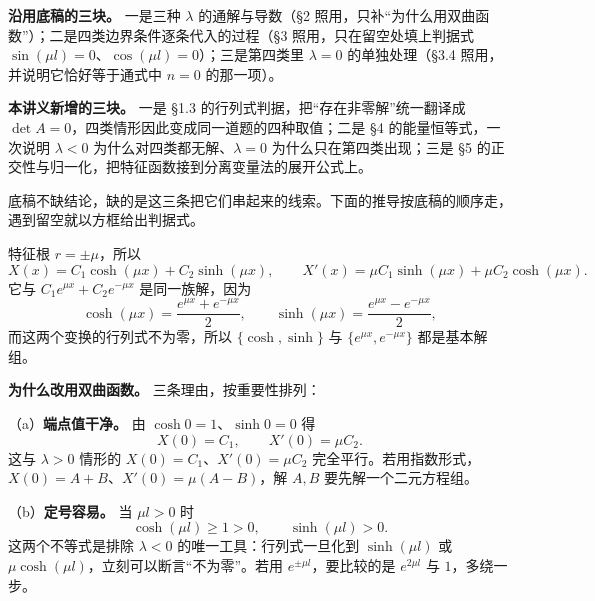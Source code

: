 \documentclass[11pt]{ctexart}
\let\orighdr\hdr
\renewcommand{\hdr}[2]{\needspace{12\baselineskip}\orighdr{#1}{#2}}
\let\origsubhdr\subhdr
\renewcommand{\subhdr}[1]{\needspace{3\baselineskip}\origsubhdr{#1}}
\begin{document}


\textbf{沿用底稿的三块。} 一是三种 $\lambda$ 的通解与导数（§2 照用，只补“为什么用双曲函数”）；二是四类边界条件逐条代入的过程（§3 照用，只在留空处填上判据式 $\sin(\mu l)=0$、$\cos(\mu l)=0$）；三是第四类里 $\lambda=0$ 的单独处理（§3.4 照用，并说明它恰好等于通式中 $n=0$ 的那一项）。

\textbf{本讲义新增的三块。} 一是 §1.3 的行列式判据，把“存在非零解”统一翻译成 $\det A=0$，四类情形因此变成同一道题的四种取值；二是 §4 的能量恒等式，一次说明 $\lambda<0$ 为什么对四类都无解、$\lambda=0$ 为什么只在第四类出现；三是 §5 的正交性与归一化，把特征函数接到分离变量法的展开公式上。

底稿不缺结论，缺的是这三条把它们串起来的线索。下面的推导按底稿的顺序走，遇到留空就以方框给出判据式。



特征根 $r=\pm\mu$，所以
\begin{equation}\label{eq:neg}
X(x)=C_1\cosh(\mu x)+C_2\sinh(\mu x),\qquad
X'(x)=\mu C_1\sinh(\mu x)+\mu C_2\cosh(\mu x).
\end{equation}
它与 $C_1e^{\mu x}+C_2e^{-\mu x}$ 是同一族解，因为
\[
\cosh(\mu x)=\frac{e^{\mu x}+e^{-\mu x}}{2},\qquad
\sinh(\mu x)=\frac{e^{\mu x}-e^{-\mu x}}{2},
\]
而这两个变换的行列式不为零，所以 $\{\cosh,\sinh\}$ 与 $\{e^{\mu x},e^{-\mu x}\}$ 都是基本解组。

\textbf{为什么改用双曲函数。} 三条理由，按重要性排列：

（a）\textbf{端点值干净。} 由 $\cosh0=1$、$\sinh0=0$ 得
\[
X(0)=C_1,\qquad X'(0)=\mu C_2 .
\]
这与 $\lambda>0$ 情形的 $X(0)=C_1$、$X'(0)=\mu C_2$ 完全平行。若用指数形式，$X(0)=A+B$、$X'(0)=\mu(A-B)$，解 $A,B$ 要先解一个二元方程组。

（b）\textbf{定号容易。} 当 $\mu l>0$ 时
\[
\cosh(\mu l)\ge1>0,\qquad \sinh(\mu l)>0 .
\]
这两个不等式是排除 $\lambda<0$ 的唯一工具：行列式一旦化到 $\sinh(\mu l)$ 或 $\mu\cosh(\mu l)$，立刻可以断言“不为零”。若用 $e^{\pm\mu l}$，要比较的是 $e^{2\mu l}$ 与 $1$，多绕一步。
\end{document}
